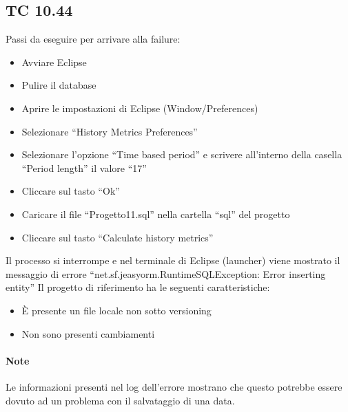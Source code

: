 \subsection*{TC 10.44}
Passi da eseguire per arrivare alla failure:
\begin{itemize}
 \item Avviare Eclipse
 \item Pulire il database
 \item Aprire le impostazioni di Eclipse (Window/Preferences)
 \item Selezionare ``History Metrics Preferences''
 \item Selezionare l'opzione ``Time based period'' e scrivere all'interno della casella ``Period length'' il valore ``17''
 \item Cliccare sul tasto ``Ok''
 \item Caricare il file ``Progetto11.sql'' nella cartella ``sql'' del progetto
 \item Cliccare sul tasto ``Calculate history metrics''
\end{itemize}
Il processo si interrompe e nel terminale di Eclipse (launcher) viene mostrato il messaggio di errore ``net.sf.jeasyorm.RuntimeSQLException: Error inserting entity''
\newline
Il progetto di riferimento ha le seguenti caratteristiche:
\begin{itemize}
 \item È presente un file locale non sotto versioning
 \item Non sono presenti cambiamenti
\end{itemize}

\paragraph{Note} Le informazioni presenti nel log dell'errore mostrano che questo potrebbe essere dovuto ad un problema con il salvataggio di una data.





\newpage





